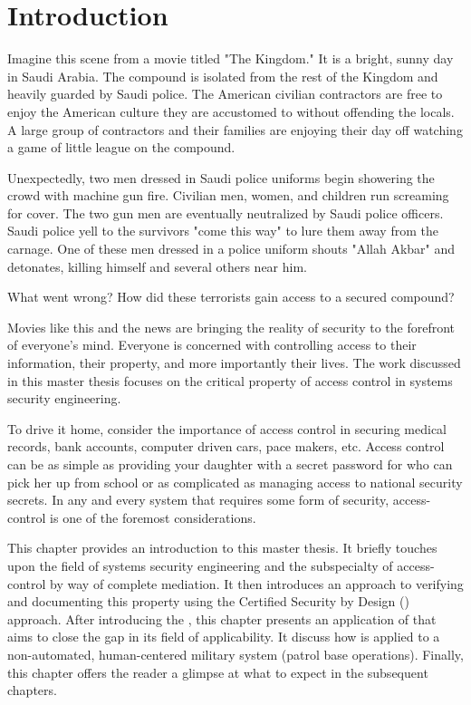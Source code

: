 \documentclass[../../main/main.tex]{subfiles}
\begin{document}
\glsresetall

\chapter{Introduction}
 Imagine this scene from a movie titled "The Kingdom."  It is a bright, sunny day in Saudi Arabia.  The compound is isolated from the rest of the Kingdom and heavily guarded by Saudi police.  The American civilian contractors are free to enjoy the American culture they are accustomed to without offending the locals.  A large group of contractors and their families are enjoying their day off watching a game of little league on the compound.  
 
 
Unexpectedly, two men dressed in Saudi police uniforms begin showering the crowd with machine gun fire.   Civilian men, women, and children run screaming for cover. The two gun men are eventually neutralized by Saudi police officers.  Saudi police yell to the survivors "come this way" to lure them away from the carnage. One of these men dressed in a police uniform shouts "Allah Akbar" and detonates, killing himself and several others near him. 

What went wrong?  How did these terrorists gain access to a secured compound?  

Movies like this and the news are bringing the reality of security to the forefront of everyone's mind.   Everyone is concerned with controlling access to their information, their property, and more importantly their lives.   The work discussed in this master thesis focuses on the critical property of access control in systems security engineering.

To drive it home, consider the importance of access control in securing medical records, bank accounts, computer driven cars, pace makers, etc.  Access control can be as simple as providing your daughter with a secret password for who can pick her up from school or as complicated as managing access to national security secrets.  In any and every system that requires some form of security, access-control is one of the foremost considerations.

This chapter provides an introduction to this master thesis.  It briefly touches upon the field of systems security engineering and the subspecialty of access-control by way of complete mediation.  It then introduces an approach to verifying and documenting this property using the Certified Security by Design () approach.  After introducing the , this chapter presents an application of  that aims to close the gap in its field of applicability.  It discuss how  is applied to a non-automated, human-centered military system (patrol base operations).  Finally, this chapter offers the reader a glimpse at what to expect in the subsequent chapters.
\end{document}
